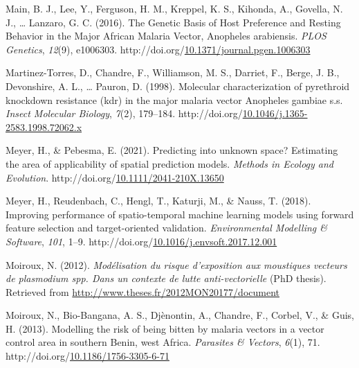 \documentclass[12pt,twoside]{reedthesis}
\newlength{\cslhangindent}
\newenvironment{CSLReferences}[2] %
 {%
  \setlength{\parindent}{0pt}
  \ifodd #1 \everypar{\setlength{\hangindent}{\cslhangindent}}\ignorespaces\fi
  \ifnum #2 > 0
  \setlength{\parskip}{#2\baselineskip}
  \fi
 }%
 {}
\begin{document}
\begin{CSLReferences}{1}{0}
\leavevmode{}%
Main, B. J., Lee, Y., Ferguson, H. M., Kreppel, K. S., Kihonda, A., Govella, N. J., \ldots{} Lanzaro, G. C. (2016). The {Genetic} {Basis} of {Host} {Preference} and {Resting} {Behavior} in the {Major} {African} {Malaria} {Vector}, {Anopheles} arabiensis. \emph{PLOS Genetics}, \emph{12}(9), e1006303. http://doi.org/\href{https://doi.org/10.1371/journal.pgen.1006303}{10.1371/journal.pgen.1006303}

\leavevmode{}%
Martinez-Torres, D., Chandre, F., Williamson, M. S., Darriet, F., Berge, J. B., Devonshire, A. L., \ldots{} Pauron, D. (1998). Molecular characterization of pyrethroid knockdown resistance (kdr) in the major malaria vector {Anopheles} gambiae s.s. \emph{Insect Molecular Biology}, \emph{7}(2), 179--184. http://doi.org/\href{https://doi.org/10.1046/j.1365-2583.1998.72062.x}{10.1046/j.1365-2583.1998.72062.x}

\leavevmode{}%
Meyer, H., \& Pebesma, E. (2021). Predicting into unknown space? {Estimating} the area of applicability of spatial prediction models. \emph{Methods in Ecology and Evolution}. http://doi.org/\href{https://doi.org/10.1111/2041-210X.13650}{10.1111/2041-210X.13650}

\leavevmode{}%
Meyer, H., Reudenbach, C., Hengl, T., Katurji, M., \& Nauss, T. (2018). Improving performance of spatio-temporal machine learning models using forward feature selection and target-oriented validation. \emph{Environmental Modelling \& Software}, \emph{101}, 1--9. http://doi.org/\href{https://doi.org/10.1016/j.envsoft.2017.12.001}{10.1016/j.envsoft.2017.12.001}

\leavevmode{}%
Moiroux, N. (2012). \emph{Modélisation du risque d'exposition aux moustiques vecteurs de plasmodium spp. Dans un contexte de lutte anti-vectorielle} (PhD thesis). Retrieved from \url{http://www.theses.fr/2012MON20177/document}

\leavevmode{}%
Moiroux, N., Bio-Bangana, A. S., Djènontin, A., Chandre, F., Corbel, V., \& Guis, H. (2013). Modelling the risk of being bitten by malaria vectors in a vector control area in southern {Benin}, west {Africa}. \emph{Parasites \& Vectors}, \emph{6}(1), 71. http://doi.org/\href{https://doi.org/10.1186/1756-3305-6-71}{10.1186/1756-3305-6-71}


\end{CSLReferences}
\end{document}
